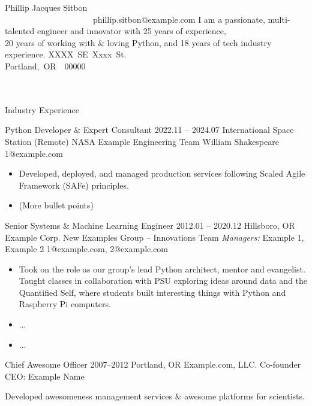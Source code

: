 \documentclass[12pt]{article}
\newcommand{\startresumeitemskillslist}{
	\begin{itemize}[nosep,leftmargin=0.8cm,rightmargin=0.65cm]
}
\newcommand{\finishresumeitemskillslist}{
	\end{itemize}\vspace{1.5em}
}
\begin{document}
\setmainfont
\header
{\Huge{Phillip Jacques Sitbon}\\
{\small ~~~~~~~~~~~~~~~~~~~~~phillip.sitbon@example.com}}
{\tiny {\tiny {\tiny I am a passionate, multi-talented engineer and innovator with 25 years of experience,\\[-0.08in]
	20 years of working with \& loving Python, and 18 years of tech industry experience.}}}
{{XXXX~SE~Xxxx~St.\\Portland,~OR~~00000}\\
\\
{~}}
\begin{resumeblock}{Industry Experience}

\resumeitemshort
{Python Developer \& Expert Consultant}
{2022{\tiny{.11}} -- 2024{\tiny{.07}}}
{International Space Station (Remote)}
{NASA}
{Example Engineering Team}
{William Shakespeare}
{1@example.com}\\[-0.1in]

\startresumeitemskillslist
\item{Developed, deployed, and managed production services following Scaled Agile Framework (SAFe) principles.}
\item{(More bullet points)}

\finishresumeitemskillslist
\resumeitemshort
{Senior Systems \& Machine Learning Engineer}
{2012{\tiny{.01}} -- 2020{\tiny{.12}}}
{Hillsboro, OR}
{Example Corp.}
{New Examples Group -- Innovations Team}
{\textit{Managers:} Example 1, Example 2}
{1@example.com, 2@example.com}\\[-0.1in]
\startresumeitemskillslist
\item{Took on the role as our group's lead Python architect, mentor and evangelist. Taught classes in collaboration with PSU exploring ideas around data and the Quantified Self, where students built interesting things with Python and Raspberry Pi computers.}
\item{...}
\item{...}
\finishresumeitemskillslist
\resumeitemshort
	{Chief Awesome Officer}
	{2007--2012}
	{Portland, OR}
	{Example.com, LLC.}
	{Co-founder}
	{CEO: Example Name}
	{}\\[-0.1in]
\par
{\addtolength{\leftskip}{0.25in}\addtolength{\rightskip}{0.25in}
Developed awesomeness management services \& awesome platforms for scientists.
\par }
\end{resumeblock}\vspace{2em}
\end{document}
